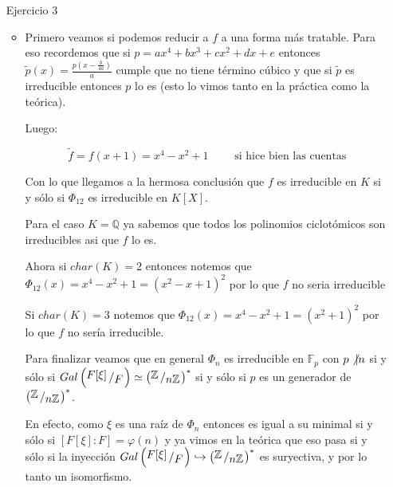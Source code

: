 \documentclass[11pt]{article}
\newcommand{\Q}{\mathbb{Q}}
\newcommand{\Z}{\mathbb{Z}}
\newcommand{\inc}{\hookrightarrow}
\newcommand{\quotient}[2]{{\raisebox{.2em}{$#1$}\left/\raisebox{-.2em}{$#2$}\right.}}
\numberwithin{theorem}{subsection}
\newcommand{\qed}{\nobreak \ifvmode \relax \else
	\ifdim\lastskip<1.5em \hskip-\lastskip
	\hskip1.5em plus0em minus0.5em \fi \nobreak
	\vrule height0.75em width0.5em depth0.25em\fi}
\begin{document}
\begin{enumerate}
\begin{itemize}
		\item Como $\Z_4$ es (isomorfo a) un subgrupo de $\Z_4 \times \Z_2$ el teorema de correspondencia de Galois nos dice que existe la torre de subextensiones $\Q \subsetneq \Q[\gamma] \subsetneq \Q[\beta]$, lo que implica directamente que $\gamma \in \Q[\beta]$. \qed
		
	\end{itemize}
	
	\item[Ejercicio 3] 
	
	\begin{itemize}
		\item Primero veamos si podemos reducir a $f$ a una forma m\'as tratable. Para eso recordemos que si $p = ax^4  + bx^3 + cx^2 + dx + e$ entonces $\widetilde{p}(x) = \frac{p(x- \frac{b}{4a})}{a}$ cumple que no tiene t\'ermino c\'ubico y que si $\widetilde{p}$ es irreducible entonces $p$ lo es (esto lo vimos tanto en la pr\'actica como la te\'orica).
		
		Luego:
		
		\begin{equation*}
			\widetilde{f} = f\left(x +1\right) = x^4 - x^2 + 1 \qquad \text{ si hice bien las cuentas}
		\end{equation*}
		
		Con lo que llegamos a la hermosa conclusi\'on que $f$ es irreducible en $K$ si y s\'olo si $\Phi_{12}$ es irreducible en $K[X]$.
		
		Para el caso $K= \Q$ ya sabemos que todos los polinomios ciclot\'omicos son irreducibles asi que $f$ lo es.
		
		Ahora si $char(K) =2$ entonces notemos que $\Phi_{12} (x) = x^4 - x^2 + 1 = \left(x^2 - x + 1\right)^2$ por lo que $f$ no seria irreducible
		
		Si $char(K) = 3$ notemos que $\Phi_{12} (x) = x^4 - x^2 + 1 = \left(x^2 + 1\right)^2$ por lo que $f$ no ser\'ia irreducible.
		
		Para finalizar veamos que en general $\Phi_n$ es irreducible en $\mathbb{F}_p$ con $p \not\vert n$ si y s\'olo si $Gal\left(\quotient{F[\xi]}{F}\right) \simeq \left(\quotient{\Z}{n\Z}\right)^*$ si y s\'olo si $p$ es un generador de $\left(\quotient{\Z}{n\Z}\right)^*$.
		
		En efecto, como $\xi$ es una ra\'iz de $\Phi_n$ entonces es igual a su minimal si y s\'olo si $[F[\xi]:F] = \varphi(n)$ y ya vimos en la te\'orica que eso pasa si y s\'olo si la inyecci\'on $Gal\left(\quotient{F[\xi]}{F}\right) \inc \left(\quotient{\Z}{n\Z}\right)^*$ es suryectiva, y por lo tanto un isomorfismo.
		

\end{itemize}
\end{enumerate}
\end{document}
